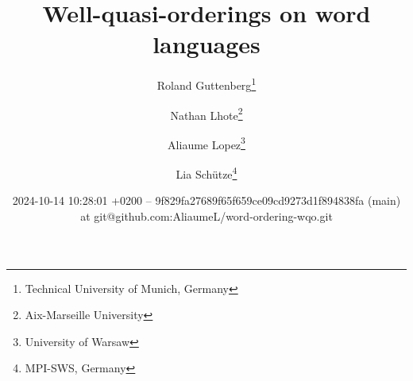 %

\title{Well-quasi-orderings on word languages}
\author{%
        Roland Guttenberg\thanks{Technical University of Munich,
Germany}
     \and
        Nathan Lhote\thanks{Aix-Marseille University}
     \and
        Aliaume Lopez\thanks{University of Warsaw}
     \and
        Lia Schütze\thanks{MPI-SWS, Germany}
    }

\date{2024-10-14 10:28:01
+0200 -- 9f829fa27689f65f659ce09cd9273d1f894838fa (main) at git@github.com:AliaumeL/word-ordering-wqo.git}

\newcommand{\makeabstract}{
\begin{abstract}
    The set of finite words over a well-quasi-ordered set is itself
    well-quasi-ordered. This seminal result by Higman is a cornerstone
    of the theory of well-quasi-orderings and has found numerous
    applications in computer science. However, this result is based on a
    specific choice of ordering on words, the (scattered) subword
    ordering. In this paper, we describe to what extent other natural
    orderings (prefix, suffix, and infix) on words can be used to derive
    Higman-like theorems. More specifically, we are interested in
    characterizing \emph{languages} of words that are well-quasi-ordered
    under these orderings. We show that a simple characterization is
    possible for the prefix and suffix orderings, and that under extra
    regularity assumptions, this also extends to the infix ordering.
\end{abstract}
}
